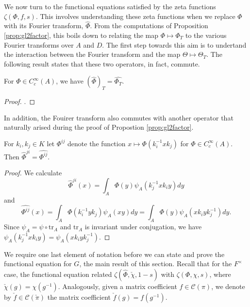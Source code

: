 We now turn to the functional equations satisfied by the zeta functions $\zeta(\Phi,f,s)$. This involves understanding these zeta functions when we replace $\Phi$ with its Fourier transform, $\hat{\Phi}$. From the computations of Proposition \ref{prop:gl2factor}, this boils down to relating the map $\Phi \mapsto \Phi_T$ to the various Fourier transforms over $A$ and $D$. The first step towards this aim is to undertand the interaction between the Fourier transform and the map $\Theta\mapsto\Theta_T$. The following result states that these two operators, in fact, commute.

\begin{lemma}
    For $\Phi \in C_c^\infty(A)$, we have $(\hat{\Phi})_T = \widehat{\Phi_T}$.
\end{lemma}
\begin{proof}
    \cite[Lemma 26.3]{BH1}.
\end{proof}

In addition, the Fouirer transform also commutes with another operator that naturally arised during the proof of Propostion \ref{prop:gl2factor}.

\begin{lemma}\label{hat}
    For $k_i,k_j \in K$ let $\Phi^{ij}$ denote the function $x \mapsto \Phi(k_i^{-1}xk_j)$ for $\Phi \in C_c^\infty(A)$. Then $\hat\Phi^{ji} = \widehat{\Phi^{ij}}$. 
\end{lemma}
\begin{proof}
    We calculate 
    $$\hat\Phi^{ji}(x) = \int_A \Phi(y)\psi_A(k_j^{-1}xk_iy)dy$$
    and 
    $$\widehat{\Phi^{ij}}(x) = \int_A\Phi(k_i^{-1}yk_j)\psi_A(xy)dy = \int_A \Phi(y)\psi_A(xk_iyk_j^{-1})dy.$$
    Since $\psi_A = \psi \circ \mathrm{tr}_A$ and $\mathrm{tr}_A$ is invariant under conjugation, we have $\psi_A(k_j^{-1}xk_iy) = \psi_A(xk_iyk_j^{-1})$.
\end{proof}

We require one last element of notation before we can state and prove the functional equation for $G$, the main result of this section. Recall that for the $F^\times$ case, the functional equation related $\zeta(\hat{\Phi},\check{\chi},1-s)$ with $\zeta(\Phi,\chi,s)$, where $\check{\chi}(g)=\chi(g^{-1})$. Analogously, given a matrix coefficient $f\in\mathcal{C}(\pi)$, we denote by $\check{f} \in \mathcal C(\check\pi)$ the matrix coefficient $\check{f}(g) = f(g^{-1})$.

